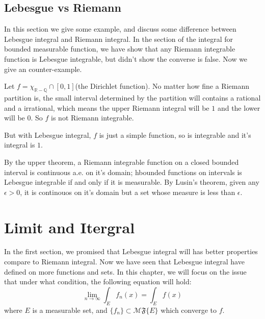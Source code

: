 \documentclass[lang=en, 12pt]{elegantbook}
\newcommand{\RR}{\mathbb{R}}
\newcommand{\QQ}{\mathbb{Q}}
\newcommand{\lmf}[1]{$\mathcal{M} \mathfrak{F} \{#1\}$}
\begin{document}
    \section{Lebesgue vs Riemann}
        In this section we give some example, and discuss some difference between Lebesgue integral and Riemann integral. In the section of 
    the integral for bounded measurable function, we have show that any Riemann integrable function is Lebesgue integrable, but didn't show 
    the converse is false. Now we give an counter-example.
        \begin{example}
            Let $f = \chi_{\RR -\QQ} \cap [0,1]$(the Dirichlet function). No matter how fine a Riemann partition is, the small interval
        determined by the partition will contains a rational and a irrational, which means the upper Riemann integral will be $1$ and 
        the lower will be $0$. So $f$ is not Riemann integrable. \par
            But with Lebesgue integral, $f$ is just a simple function, so is integrable and it's integral is $1$.
        \end{example}

        \begin{theorem}
            
        \end{theorem}
        By the upper theorem, a Riemann integrable function on a closed bounded interval is continuous a.e. on it's domain; hbounded 
    functions on intervals is Lebesgue integrable if and only if it is measurable. By Lusin's theorem, given any $\epsilon>0$, it is 
    continouos on it's domain but a set whose measure is less than $\epsilon$. 

\chapter{Limit and Itergral}
        In the first section, we promised that Lebesgue integral will has better properties compare to Riemann integral. Now we have 
    seen that Lebesgue integral have defined on more functions and sets. In this chapter, we will focus on the issue 
    that under what condition, the following equation will hold: 
    \begin{equation*}
        \lim_{n \to \infty} \int_E f_n(x) = \int_E f(x) 
    \end{equation*}
    where $E$ is a measurable set, and $\{f_n\} \subset $\lmf{E} which converge to $f$.  
\end{document}
